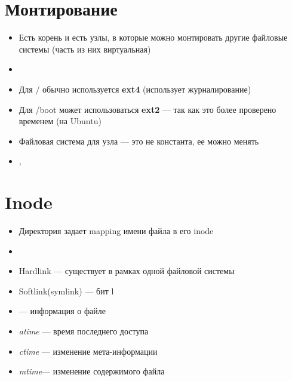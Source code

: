 \documentclass[../lectures.tex]{subfiles}
\begin{document}
\section{Монтирование}
\begin{itemize}
    \item Есть корень и есть узлы, в которые можно монтировать другие файловые системы (часть из них виртуальная)
    \item {}
    \item Для $/$ обычно используется \textbf{ext4} (использует журналирование)
    \item Для /boot может использоваться \textbf{ext2} --- так как это более проверено временем (на Ubuntu)
    \item Файловая система для узла --- это не константа, ее можно менять
    \item {}, 
\end{itemize}

\section{Inode}
\begin{itemize}
    \item Директория задает mapping имени файла в его inode
    \item {}
    \item Hardlink --- существует в рамках одной файловой системы
    \item Softlink(symlink) --- бит l
    \item {} --- информация о файле
    \item \emph{atime} --- время последнего доступа
    \item \emph{ctime} --- изменение мета-информации
    \item \emph{mtime}--- изменение содержимого файла
\end{itemize}
\end{document}

